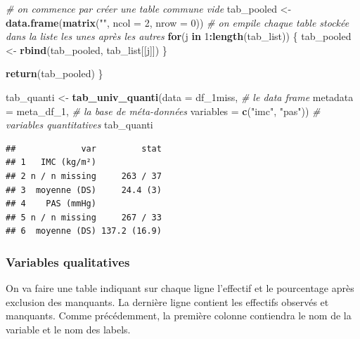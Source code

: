 \documentclass[
]{book}
\newenvironment{Shaded}{\begin{snugshade}}{\end{snugshade}}
\newcommand{\AttributeTok}[1]{\textcolor[rgb]{0.13,0.29,0.53}{#1}}
\newcommand{\CommentTok}[1]{\textcolor[rgb]{0.56,0.35,0.01}{\textit{#1}}}
\newcommand{\ControlFlowTok}[1]{\textcolor[rgb]{0.13,0.29,0.53}{\textbf{#1}}}
\newcommand{\DecValTok}[1]{\textcolor[rgb]{0.00,0.00,0.81}{#1}}
\newcommand{\FunctionTok}[1]{\textcolor[rgb]{0.13,0.29,0.53}{\textbf{#1}}}
\newcommand{\NormalTok}[1]{#1}
\newcommand{\OtherTok}[1]{\textcolor[rgb]{0.56,0.35,0.01}{#1}}
\newcommand{\SpecialCharTok}[1]{\textcolor[rgb]{0.81,0.36,0.00}{\textbf{#1}}}
\newcommand{\StringTok}[1]{\textcolor[rgb]{0.31,0.60,0.02}{#1}}
\begin{document}
\begin{Shaded}
\begin{Highlighting}[]
  \CommentTok{\# on commence par créer une table commune vide}
\NormalTok{  tab\_pooled }\OtherTok{\textless{}{-}} \FunctionTok{data.frame}\NormalTok{(}\FunctionTok{matrix}\NormalTok{(}\StringTok{""}\NormalTok{, }\AttributeTok{ncol =} \DecValTok{2}\NormalTok{, }\AttributeTok{nrow =} \DecValTok{0}\NormalTok{))}
  \CommentTok{\# on empile chaque table stockée dans la liste les unes après les autres}
  \ControlFlowTok{for}\NormalTok{(j }\ControlFlowTok{in} \DecValTok{1}\SpecialCharTok{:}\FunctionTok{length}\NormalTok{(tab\_list)) \{}
\NormalTok{    tab\_pooled }\OtherTok{\textless{}{-}} \FunctionTok{rbind}\NormalTok{(tab\_pooled, tab\_list[[j]])}
\NormalTok{  \}}
  
  \FunctionTok{return}\NormalTok{(tab\_pooled)}
\NormalTok{\}}

\NormalTok{tab\_quanti }\OtherTok{\textless{}{-}} \FunctionTok{tab\_univ\_quanti}\NormalTok{(}\AttributeTok{data =}\NormalTok{ df\_1miss, }\CommentTok{\# le data frame}
                              \AttributeTok{metadata =}\NormalTok{ meta\_df\_1, }\CommentTok{\# la base de méta{-}données}
                              \AttributeTok{variables =} \FunctionTok{c}\NormalTok{(}\StringTok{"imc"}\NormalTok{, }\StringTok{"pas"}\NormalTok{)) }\CommentTok{\# variables quantitatives}
\NormalTok{tab\_quanti}
\end{Highlighting}
\end{Shaded}

\begin{verbatim}
##             var         stat
## 1   IMC (kg/m²)             
## 2 n / n missing     263 / 37
## 3  moyenne (DS)     24.4 (3)
## 4    PAS (mmHg)             
## 5 n / n missing     267 / 33
## 6  moyenne (DS) 137.2 (16.9)
\end{verbatim}

\subsubsection{Variables qualitatives}\label{variables-qualitatives-2}

On va faire une table indiquant sur chaque ligne l'effectif et le pourcentage après exclusion des manquants. La dernière ligne contient les effectifs observés et manquants. Comme précédemment, la première colonne contiendra le nom de la variable et le nom des labels.
\end{document}

